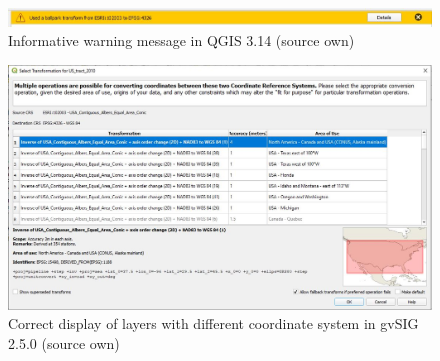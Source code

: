 \documentclass[a4paper,10pt,twoside]{article}
\begin{document}
\begin{figure}[hbt!] 
\begin{center}
\includegraphics[width=15cm]{../pictures/qgis_warning_window.JPG} 
\caption[Informative warning message  in QGIS 3.14 (source own)]{Informative warning message  in QGIS 3.14 (source own)}
\label{fig:qgis_warning_window}
\end{center}
\end{figure}

\begin{figure}[hbt!] 
\begin{center}
\includegraphics[width=14cm]{../pictures/qgis_transformation.JPG} 
\caption[Correct display of layers with different coordinate system in gvSIG 2.5.0 (source own)]{Correct display of layers with different coordinate system in gvSIG 2.5.0 (source own)}
\label{fig:qgis_transformation}
\end{center}
\end{figure}
\end{document}
